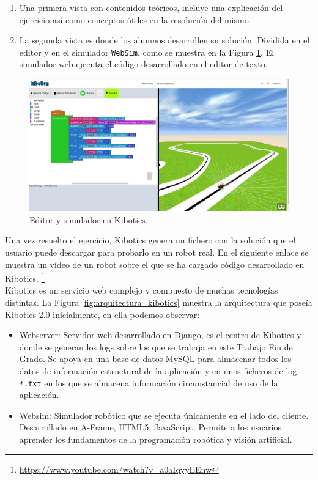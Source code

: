 \documentclass[a4paper, 12pt]{book}
\begin{document}
		
		\begin{enumerate}
			\item Una primera vista con contenidos teóricos, incluye una explicación del ejercicio así como conceptos útiles en la resolución del mismo. 
			\item La segunda vista es donde los alumnos desarrollen su solución. Dividida en el editor y en el simulador \texttt{WebSim}, como se muestra en la Figura \ref{fig:editor_simulador_kibotics}. El simulador web ejecuta el código desarrollado en el editor de texto.
		\end{enumerate}
		
		\begin{figure}[H]
			\centering
			\includegraphics[width=13cm, keepaspectratio]{img/websim-siguelinea.png}
			\caption{Editor y simulador en Kibotics.}
			\label{fig:editor_simulador_kibotics}
		\end{figure}
		
		Una vez resuelto el ejercicio, Kibotics genera un fichero con la solución que el usuario puede descargar para probarlo en un robot real. En el siguiente enlace se muestra un vídeo de un robot sobre el que se ha cargado código desarrollado en Kibotics. \footnote{\url{https://www.youtube.com/watch?v=a0aIqyyEEnw}} \\
		
		Kibotics es un servicio web complejo y compuesto de muchas tecnologías distintas. La Figura \ref{fig:arquitectura_kibotics} muestra la arquitectura que poseía Kibotics 2.0 inicialmente, en ella podemos observar:
		
		\begin{itemize}
			\item Webserver: Servidor web desarrollado en Django, es el centro de Kibotics y donde se generan los logs sobre los que se trabaja en este Trabajo Fin de Grado. Se apoya en una base de datos MySQL para almacenar todos los datos de información estructural de la aplicación y en unos ficheros de log \texttt{*.txt} en los que se almacena información circunstancial de uso de la aplicación.
						
			\item Websim: Simulador robótico que se ejecuta únicamente en el lado del cliente. Desarrollado en A-Frame, HTML5, JavaScript. Permite a los usuarios aprender los fundamentos de la programación robótica y visión artificial.
		\end{itemize}
		
\end{document}
